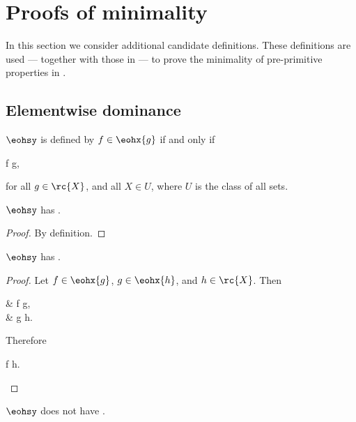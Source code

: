 \documentclass[b5paper, english, oneside]{memoir}
\begin{document}
\chapter{Proofs of minimality}
\label{ProofsOfMinimality}

In this section we consider additional candidate definitions. These definitions are used --- together with those in  --- to prove the minimality of pre-primitive properties in .

\section{Elementwise dominance}
\label{ElementwiseDominance}

\begin{definition}
 $\eohsy$ is defined by $f \in \eohx{g}$ if and only if
\begin{eqs}
f \leq g,
\end{eqs}
for all $g \in \rc{X}$, and all $X \in U$, where $U$ is the class of all sets.
\end{definition}

\begin{theorem}
\label{ElementwiseOrder}
$\eohsy$ has .
\end{theorem}

\begin{proof}
By definition. 
\end{proof}

\begin{theorem}
\label{ElementwiseTransivity}
$\eohsy$ has .
\end{theorem}

\begin{proof}
Let $f \in \eohx{g}$, $g \in \eohx{h}$, and $h \in \rc{X}$. Then
\begin{eqs}
{} & f \leq g, \\
{} & g \leq h.
\end{eqs}
Therefore
\begin{eqs}
f \leq h.
\end{eqs}
\end{proof}

\begin{theorem}
\label{ElementwiseScaleInvarianceFails}
$\eohsy$ does not have .
\end{theorem}
\end{document}
